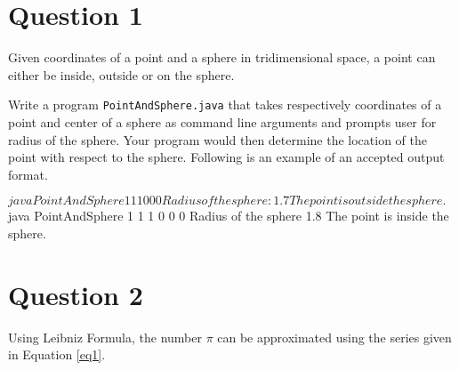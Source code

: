 %
%
%
%

\section*{Question 1}
Given coordinates of a point and a sphere in tridimensional space, a point can either be inside, outside or on the sphere.

Write a program \texttt{PointAndSphere.java} that takes respectively coordinates of a point and center of a sphere as command line arguments and prompts user for radius of the sphere.
Your program would then determine the location of the point with respect to the sphere.
Following is an example of an accepted output format.

\begin{terminal}
$ java PointAndSphere 1 1 1 0 0 0
Radius of the sphere: 1.7
The point is outside the sphere.
$ java PointAndSphere 1 1 1 0 0 0
Radius of the sphere 1.8
The point is inside the sphere.
\end{terminal}

\section*{Question 2}
Using Leibniz Formula, the number $\pi$ can be approximated using the series given in Equation \ref{eq1}.

